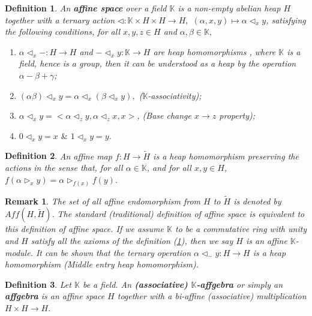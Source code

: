 \documentclass{article}
\newtheorem{remark}{Remark}[section]
\newtheorem{definition}{Definition}[section]
\theoremstyle{definition}
\theoremstyle{remark}
\theoremstyle{plain}
\begin{document}
\begin{definition}\label{Def2.4}\cite{And2,BBRS1, Bre1, Brz1} An \textbf{affine space} over a field $\mathbb{K}$ is a non-empty abelian heap $H$ together with a ternary action $\triangleleft :\mathbb{K}\times H\times H \rightarrow H,$ $(\alpha, x, y)\mapsto \alpha \triangleleft_{x}y$, satisfying the following conditions, for all $x, y, z \in H$ and $\alpha, \beta \in \mathbb{K},$ 
    \begin{enumerate}
        \item $\alpha  \triangleleft_{x}- : H\rightarrow H$ and $-\triangleleft_{x}y:\mathbb{K}\rightarrow H$ are heap homomorphisms
        , where $\mathbb{K}$ is a field, hence is a group, then it can be understood as a heap by the operation $\alpha -\beta + \gamma$;
        \item $(\alpha \beta)\triangleleft_{x}y=\alpha \triangleleft_{x}(\beta\triangleleft_{x}y),$ ($\mathbb{K}$-associativity);
        \item $\alpha \triangleleft_{x}y=<\alpha\triangleleft_{z}y, \alpha\triangleleft_{z}x,x>$, (Base change $x\rightarrow z$ property);
        \item $0\triangleleft_{x}y=x$ $\&$ $ 1\triangleleft_{x}y=y.$
    \end{enumerate}
\end{definition}
\begin{definition}
    An affine map $f: H\rightarrow \widetilde{H}$ is a heap homomorphism preserving the actions in the sense that, for all $\alpha \in \mathbb{K}$, and for all $x, y \in H$,
    $f(\alpha \triangleright_{x}y)=\alpha\triangleright_{f(x)}f(y).$
\end{definition}
\begin{remark}
   The set of all affine endomorphism from $H$ to $\widetilde{H}$ is denoted by $Aff(H, \widetilde{H})$. The standard (traditional) definition of affine space is equivalent to this definition of affine space. If we assume $\mathbb{K}$ to be a commutative ring with unity and $H$ satisfy all the axioms of the definition (\ref{Def2.4}), then we say $H$ is an \emph{affine $\mathbb{K}$-module}. It can be shown that the ternary operation $\alpha \triangleleft_{-}y: H\rightarrow H$ is a heap homomorphism (Middle entry heap homomorphism). 
\end{remark}
\begin{definition}\cite{Brz1}
    Let $\mathbb{K}$ be a field. An \textbf{(associative) $\mathbb{K}$-affgebra} or simply an \textbf{affgebra} is an affine space $H$ together with a bi-affine (associative) multiplication $H\times H\rightarrow H.$
\end{definition}
\end{document}
